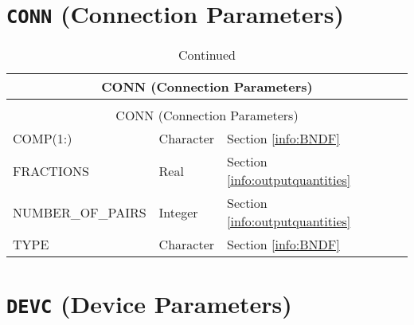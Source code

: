 \section{\texorpdfstring{{\tt CONN}}{CONN} (Connection Parameters)}

\begin{longtable}{@{\extracolsep{\fill}}|l|l|l|l|l|}
\caption[Boundary file parameters ({\ct CONN} namelist group)]{For more information see Section~\ref{info:BNDF}.}
\label{tbl:CONN} \\
\hline
\multicolumn{5}{|c|}{{\ct CONN} (Connection Parameters)} \\
\hline \hline
\endfirsthead
\caption[]{Continued} \\
\hline
\multicolumn{5}{|c|}{{\ct CONN} (Connection Parameters)} \\
\hline \hline
\endhead
{\ct COMP(1:)}          & Character     & Section \ref{info:BNDF}                 &           &   \\ \hline
{\ct FRACTIONS}          & Real   & Section \ref{info:outputquantities}     &           &                 \\ \hline
{\ct NUMBER\_OF\_PAIRS}          & Integer   & Section \ref{info:outputquantities}     &           &                 \\ \hline
{\ct TYPE}        & Character   & Section \ref{info:BNDF}                 &           &                 \\ \hline
\end{longtable}

\vspace{\baselineskip}


\section{\texorpdfstring{{\tt DEVC}}{DEVC} (Device Parameters)}

